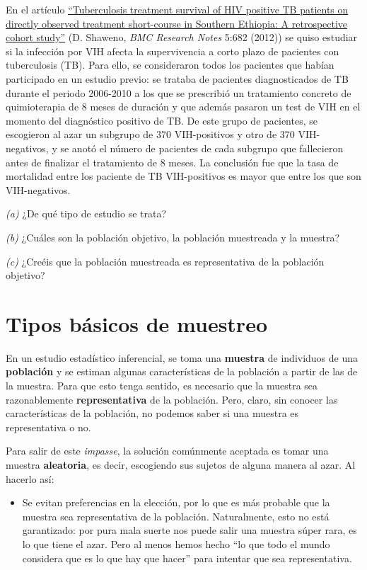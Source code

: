 \documentclass[
]{book}
\providecommand{\tightlist}{%
  \setlength{\itemsep}{0pt}\setlength{\parskip}{0pt}}
\theoremstyle{definition}
\theoremstyle{definition}
\theoremstyle{definition}
\theoremstyle{definition}
\theoremstyle{remark}
\begin{document}
\begin{rmdexercici}
En el artículo \href{https://bmcresnotes.biomedcentral.com/articles/10.1186/1756-0500-5-682}{``Tuberculosis treatment survival of HIV positive TB patients on directly observed treatment short-course in Southern Ethiopia: A retrospective cohort study''} (D. Shaweno, \emph{BMC Research Notes} 5:682 (2012)) se quiso estudiar si la infección por VIH afecta la supervivencia a corto plazo de pacientes con tuberculosis (TB). Para ello, se consideraron todos los pacientes que habían participado en un estudio previo: se trataba de pacientes diagnosticados de TB durante el periodo 2006-2010 a los que se prescribió un tratamiento concreto de quimioterapia de 8 meses de duración y que además pasaron un test de VIH en el momento del diagnóstico positivo de TB. De este grupo de pacientes, se escogieron al azar un subgrupo de 370 VIH-positivos y otro de 370 VIH-negativos, y se anotó el número de pacientes de cada subgrupo que fallecieron antes de finalizar el tratamiento de 8 meses. La conclusión fue que la tasa de mortalidad entre los paciente de TB VIH-positivos es mayor que entre los que son VIH-negativos.

\emph{(a)} ¿De qué tipo de estudio se trata?

\emph{(b)} ¿Cuáles son la población objetivo, la población muestreada y la muestra?

\emph{(c)} ¿Creéis que la población muestreada es representativa de la población objetivo?
\end{rmdexercici}

\hypertarget{sec:muestreo}{%
\section{Tipos básicos de muestreo}\label{sec:muestreo}}

En un estudio estadístico inferencial, se toma una \textbf{muestra} de individuos de una \textbf{población} y se estiman algunas características de la población a partir de las de la muestra. Para que esto tenga sentido, es necesario que la muestra sea razonablemente \textbf{representativa} de la población. Pero, claro, sin conocer las características de la población, no podemos saber si una muestra es representativa o no.

Para salir de este \emph{impasse}, la solución comúnmente aceptada es tomar una muestra \textbf{aleatoria}, es decir, escogiendo sus sujetos de alguna manera al azar. Al hacerlo así:

\begin{itemize}
\tightlist
\item
  Se evitan preferencias en la elección, por lo que es más probable que la muestra sea representativa de la población. Naturalmente, esto no está garantizado: por pura mala suerte nos puede salir una muestra súper rara, es lo que tiene el azar.
  Pero al menos hemos hecho ``lo que todo el mundo considera que es lo que hay que hacer'' para intentar que sea representativa.
\end{itemize}
\end{document}
